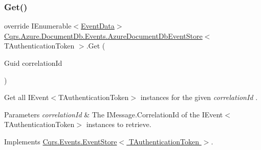 \subsubsection{\texorpdfstring{Get()}{Get()}\hspace{0.1cm}{\footnotesize\ttfamily [2/2]}}
{\footnotesize\ttfamily override I\+Enumerable$<$\hyperlink{classCqrs_1_1Events_1_1EventData}{Event\+Data}$>$ \hyperlink{classCqrs_1_1Azure_1_1DocumentDb_1_1Events_1_1AzureDocumentDbEventStore}{Cqrs.\+Azure.\+Document\+Db.\+Events.\+Azure\+Document\+Db\+Event\+Store}$<$ T\+Authentication\+Token $>$.Get (\begin{DoxyParamCaption}\item[{Guid}]{correlation\+Id }\end{DoxyParamCaption})\hspace{0.3cm}{\ttfamily [virtual]}}



Get all I\+Event$<$\+T\+Authentication\+Token$>$ instances for the given {\itshape correlation\+Id} . 


\begin{DoxyParams}{Parameters}
{\em correlation\+Id} & The I\+Message.\+Correlation\+Id of the I\+Event$<$\+T\+Authentication\+Token$>$ instances to retrieve.\\
\hline
\end{DoxyParams}


Implements \hyperlink{classCqrs_1_1Events_1_1EventStore_a0096646f5dff730b0041b9469719c420_a0096646f5dff730b0041b9469719c420}{Cqrs.\+Events.\+Event\+Store$<$ T\+Authentication\+Token $>$}.

\mbox{\label{classCqrs_1_1Azure_1_1DocumentDb_1_1Events_1_1AzureDocumentDbEventStore_a8b481bf0b0f6b50184441965630f5443_a8b481bf0b0f6b50184441965630f5443}} 
